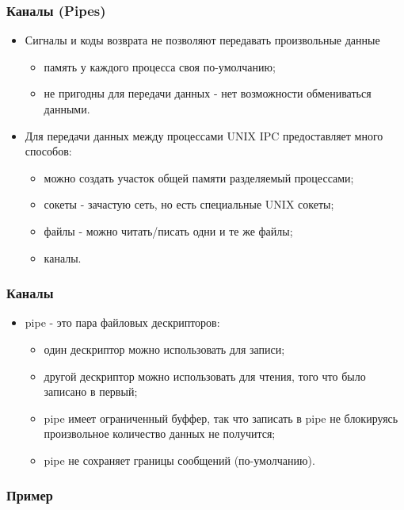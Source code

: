 \begin{frame}
\frametitle{Каналы (Pipes)}
\begin{itemize}
  \item Сигналы и коды возврата не позволяют передавать произвольные данные
  \begin{itemize}
    \item память у каждого процесса своя по-умолчанию;
    \item не пригодны для передачи данных - нет возможности обмениваться
    данными.
  \end{itemize}
  \item Для передачи данных между процессами UNIX IPC предоставляет много
  способов:
  \begin{itemize}
    \item можно создать участок общей памяти разделяемый процессами;
    \item сокеты - зачастую сеть, но есть специальные UNIX сокеты;
    \item файлы - можно читать/писать одни и те же файлы;
    \item каналы.
  \end{itemize}
\end{itemize}
\end{frame}

\begin{frame}
\frametitle{Каналы}
\begin{itemize}
  \item pipe - это пара файловых дескрипторов:
  \begin{itemize}
    \item один дескриптор можно использовать для записи;
    \item другой дескриптор можно использовать для чтения, того что было
    записано в первый;
    \item pipe имеет ограниченный буффер, так что записать в pipe не блокируясь
    произвольное количество данных не получится;
    \item pipe не сохраняет границы сообщений (по-умолчанию).
  \end{itemize}
\end{itemize}
\end{frame}

\begin{frame}[fragile]
\frametitle{Пример}



\end{frame}
